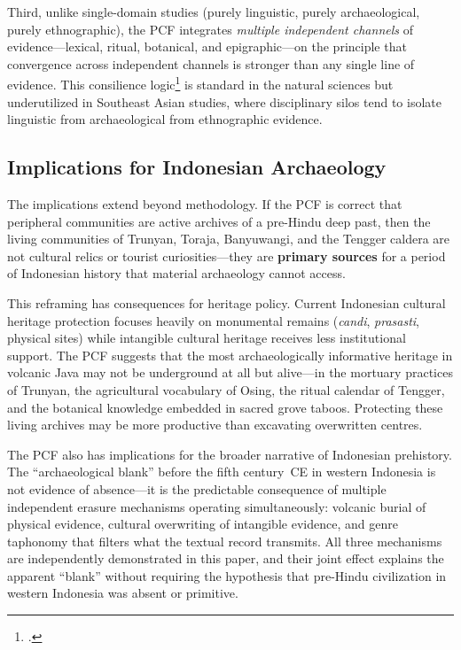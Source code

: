 \documentclass[12pt,a4paper]{article}
\begin{document}
Third, unlike single-domain studies (purely linguistic, purely archaeological, purely ethnographic), the PCF integrates \emph{multiple independent channels} of evidence---lexical, ritual, botanical, and epigraphic---on the principle that convergence across independent channels is stronger than any single line of evidence. This consilience logic\footnote{\autocite{whewell1840philosophy}.} is standard in the natural sciences but underutilized in Southeast Asian studies, where disciplinary silos tend to isolate linguistic from archaeological from ethnographic evidence.

\subsection{Implications for Indonesian Archaeology}

The implications extend beyond methodology. If the PCF is correct that peripheral communities are active archives of a pre-Hindu deep past, then the living communities of Trunyan, Toraja, Banyuwangi, and the Tengger caldera are not cultural relics or tourist curiosities---they are \textbf{primary sources} for a period of Indonesian history that material archaeology cannot access.

This reframing has consequences for heritage policy. Current Indonesian cultural heritage protection focuses heavily on monumental remains (\emph{candi}, \emph{prasasti}, physical sites) while intangible cultural heritage receives less institutional support. The PCF suggests that the most archaeologically informative heritage in volcanic Java may not be underground at all but alive---in the mortuary practices of Trunyan, the agricultural vocabulary of Osing, the ritual calendar of Tengger, and the botanical knowledge embedded in sacred grove taboos. Protecting these living archives may be more productive than excavating overwritten centres.

The PCF also has implications for the broader narrative of Indonesian prehistory. The ``archaeological blank'' before the fifth century~CE in western Indonesia is not evidence of absence---it is the predictable consequence of multiple independent erasure mechanisms operating simultaneously: volcanic burial of physical evidence, cultural overwriting of intangible evidence, and genre taphonomy that filters what the textual record transmits. All three mechanisms are independently demonstrated in this paper, and their joint effect explains the apparent ``blank'' without requiring the hypothesis that pre-Hindu civilization in western Indonesia was absent or primitive.
\end{document}

